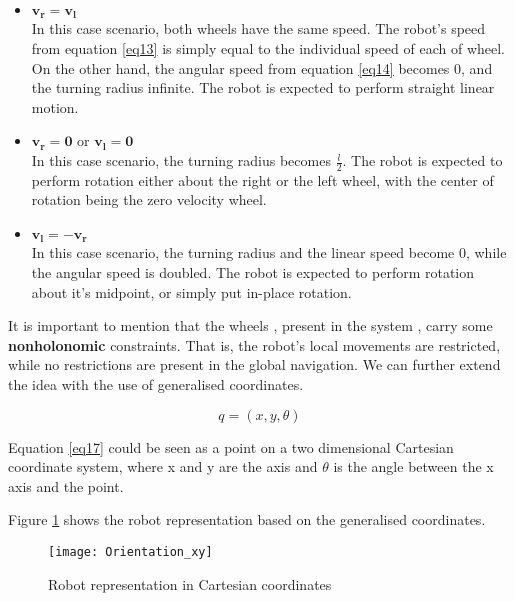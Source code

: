 \begin{itemize} \label{list_v}

\item $\boldsymbol{v_r = v_l}$ \\ In this case scenario, both wheels have the same speed. The robot's speed from equation \ref{eq13} is simply equal to the individual speed of each of wheel. On the other hand, the angular speed from equation \ref{eq14} becomes 0, and the turning radius infinite. The robot is expected to perform straight linear motion.

\item $\boldsymbol{v_r = 0}$ or $\boldsymbol{v_l = 0}$ \\ In this case scenario, the turning radius becomes $\frac{l}{2}$. The robot is expected to perform rotation either about the right or the left wheel, with the center of rotation being the zero velocity wheel. 

\item $\boldsymbol{v_l = -v_r}$ \\ In this case scenario, the turning radius and the linear speed become 0, while the angular speed is doubled. The robot is expected to perform rotation about it's midpoint, or simply put in-place rotation.

\end{itemize}

It is important to mention that the wheels , present in the system , carry some \textbf{nonholonomic} constraints. That is, the robot's local movements are restricted, while no restrictions are present in the global navigation. We can further extend the idea with the use of generalised coordinates.

\begin{equation} \label{eq17}
q = (x,y,\theta) 
\end{equation}

Equation \ref{eq17} could be seen as a point on a two dimensional Cartesian coordinate system, where x and y are the axis and $\theta$ is the angle between the x axis and the point. 

Figure \ref{fig::orientation} shows the robot representation based on the generalised coordinates.

\begin{figure}[h]
\centering
\texttt{[image: Orientation\_xy]}
\caption{Robot representation in Cartesian coordinates}
\label{fig::orientation}
\end{figure}

